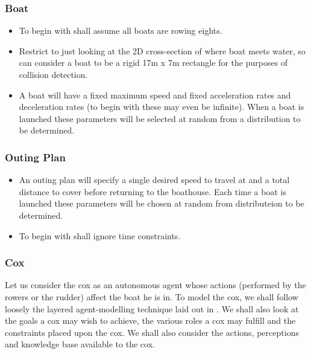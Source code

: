 \subsubsection{Boat}
\begin{itemize}
  \item To begin with shall assume all boats are rowing eights.
  \item Restrict to just looking at the 2D cross-section of where boat
    meets water, so can consider a boat to be a rigid 17m x 7m rectangle for
    the purposes of collision detection.
  \item A boat will have a fixed maximum speed and fixed acceleration
    rates and deceleration rates (to begin with these may even be
    infinite). When a boat is launched these parameters will be
    selected at random from a distribution to be determined.
\end{itemize}

\subsubsection{Outing Plan}
\begin{itemize}
  \item An outing plan will specify a single desired speed to travel at
    and a total distance to cover before returning to the
    boathouse. Each time a boat is launched these parameters will be
    chosen at random from distributeion to be determined.
  \item To begin with shall ignore time constraints.
\end{itemize}

\subsubsection{Cox}
Let us consider the cox as an autonomous agent whose actions
(performed by the rowers or the rudder) affect the boat he is in. To
model the cox, we shall follow loosely the layered agent-modelling
technique laid out in \cite{Sterling2009}. We shall also look at the
goals a cox may wish to achieve, the various roles a cox may fulfill
and the constraints placed upon the cox. We shall also consider the
actions, perceptions and knowledge base available to the cox.

